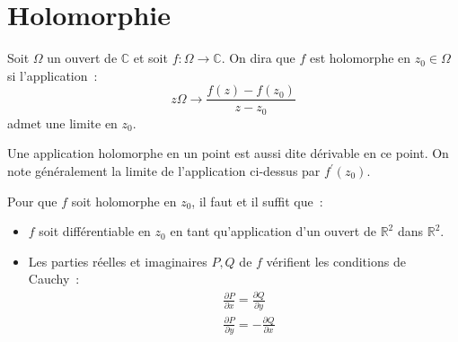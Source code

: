 \section{Holomorphie}
\begin{fdefn}
Soit $\Omega $ un ouvert de $\mathbb{C}$ et soit $f : \Omega \to
\mathbb{C}$. On dira que $f$ est holomorphe en $z_0 \in \Omega$ si
l'application~:
\[
z \Omega \to \frac{f(z) - f(z_0)}{z - z_0}
\]
admet une limite en $z_0$.
\end{fdefn}
\begin{rem}
Une application holomorphe en un point est aussi dite dérivable en ce
point. On note généralement la limite de l'application ci-dessus par
$f^\prime(z_0)$.
\end{rem}
\begin{fprop}\label{prop:hol_1}
Pour que $f$ soit holomorphe en $z_0$, il faut et il suffit que~:
\begin{itemize}
\item $f$ soit différentiable en $z_0$ en tant qu'application d'un
  ouvert de $\mathbb{R}^2$ dans $\mathbb{R}^2$.
\item Les parties réelles et imaginaires $P,Q$ de $f$ vérifient les
  conditions de Cauchy~:
\begin{align*}
&\frac{\partial P}{\partial x} = \frac{\partial Q}{\partial y} \\
&\frac{\partial P}{\partial y} = - \frac{\partial Q}{\partial x}
\end{align*}
\end{itemize}
\end{fprop}
